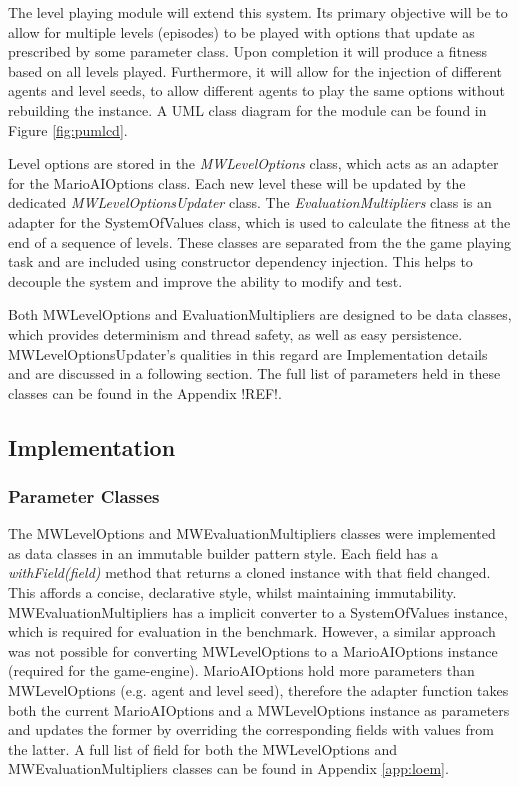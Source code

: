 \vspace{\baselineskip}

The level playing module will extend this system. Its primary objective will be to allow for multiple levels (episodes) to be played with options that update as prescribed by some parameter class. Upon completion it will produce a fitness based on all levels played. Furthermore, it will allow for the injection of different agents and level seeds, to allow different agents to play the same options without rebuilding the instance. A UML class diagram for the module can be found in Figure \ref{fig:pumlcd}.

Level options are stored in the \emph{MWLevelOptions} class, which acts as an adapter for the MarioAIOptions class. Each new level these will be updated by the dedicated \emph{MWLevelOptionsUpdater} class. The \emph{EvaluationMultipliers} class is an adapter for the SystemOfValues class, which is used to calculate the fitness at the end of a sequence of levels. These classes are separated from the the game playing task and are included using constructor dependency injection. This helps to decouple the system and improve the ability to modify and test.

Both MWLevelOptions and EvaluationMultipliers are designed to be data classes, which provides determinism and thread safety, as well as easy persistence. MWLevelOptionsUpdater's qualities in this regard are Implementation details and are discussed in a following section. The full list of parameters held in these classes can be found in the Appendix !REF!.



\subsection{Implementation}

\subsubsection{Parameter Classes}
\label{subsec:paramclasses}

The MWLevelOptions and MWEvaluationMultipliers classes were implemented as data classes in an immutable builder pattern style. Each field has a \emph{withField(field)} method that returns a cloned instance with that field changed. This affords a concise, declarative style, whilst maintaining immutability. MWEvaluationMultipliers has a implicit converter to a SystemOfValues instance, which is required for evaluation in the benchmark. However, a similar approach was not possible for converting MWLevelOptions to a MarioAIOptions instance (required for the game-engine). MarioAIOptions hold more parameters than MWLevelOptions (e.g. agent and level seed), therefore the adapter function takes both the current MarioAIOptions and a MWLevelOptions instance as parameters and updates the former by overriding the corresponding fields with values from the latter. A full list of field for both the MWLevelOptions and MWEvaluationMultipliers classes can be found in Appendix \ref{app:loem}.

